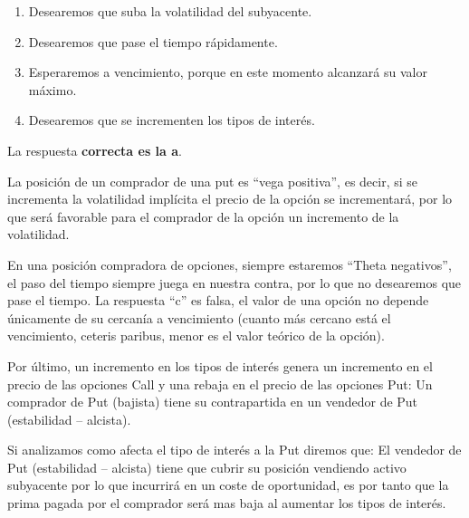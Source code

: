 \documentclass[
  letterpaper,
  DIV=11,
  numbers=noendperiod]{scrreprt}
\begin{document}
\begin{enumerate}
\def\labelenumi{\alph{enumi})}
\item
  Desearemos que suba la volatilidad del subyacente.
\item
  Desearemos que pase el tiempo rápidamente.
\item
  Esperaremos a vencimiento, porque en este momento alcanzará su valor
  máximo.
\item
  Desearemos que se incrementen los tipos de interés.
\end{enumerate}

\begin{tcolorbox}[enhanced jigsaw, left=2mm, opacityback=0, colback=white, breakable, arc=.35mm, bottomrule=.15mm, rightrule=.15mm, toprule=.15mm, leftrule=.75mm, colframe=quarto-callout-tip-color-frame]
\begin{minipage}[t]{5.5mm}
\textcolor{quarto-callout-tip-color}{\faLightbulb}
\end{minipage}%
\begin{minipage}[t]{\textwidth - 5.5mm}

La respuesta \textbf{correcta es la a}.

La posición de un comprador de una put es ``vega positiva'', es decir,
si se incrementa la volatilidad implícita el precio de la opción se
incrementará, por lo que será favorable para el comprador de la opción
un incremento de la volatilidad.

En una posición compradora de opciones, siempre estaremos ``Theta
negativos'', el paso del tiempo siempre juega en nuestra contra, por lo
que no desearemos que pase el tiempo. La respuesta ``c'' es falsa, el
valor de una opción no depende únicamente de su cercanía a vencimiento
(cuanto más cercano está el vencimiento, ceteris paribus, menor es el
valor teórico de la opción).

Por último, un incremento en los tipos de interés genera un incremento
en el precio de las opciones Call y una rebaja en el precio de las
opciones Put: Un comprador de Put (bajista) tiene su contrapartida en un
vendedor de Put (estabilidad -- alcista).

Si analizamos como afecta el tipo de interés a la Put diremos que: El
vendedor de Put (estabilidad -- alcista) tiene que cubrir su posición
vendiendo activo subyacente por lo que incurrirá en un coste de
oportunidad, es por tanto que la prima pagada por el comprador será mas
baja al aumentar los tipos de interés.

\end{minipage}%
\end{tcolorbox}
\end{document}
